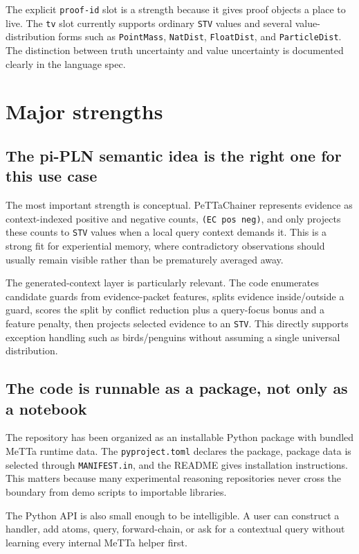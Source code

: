 \documentclass[11pt]{article}
\newcommand{\code}[1]{\texttt{#1}}
\newcommand{\fpath}[1]{\texttt{#1}}
\begin{document}
The explicit \code{proof-id} slot is a strength because it gives proof objects a
place to live.  The \code{tv} slot currently supports ordinary \code{STV} values
and several value-distribution forms such as \code{PointMass}, \code{NatDist},
\code{FloatDist}, and \code{ParticleDist}.  The distinction between truth
uncertainty and value uncertainty is documented clearly in the language spec.

\section{Major strengths}

\subsection{The pi-PLN semantic idea is the right one for this use case}

The most important strength is conceptual.  PeTTaChainer represents evidence as
context-indexed positive and negative counts, \code{(EC pos neg)}, and only
projects these counts to \code{STV} values when a local query context demands it.
This is a strong fit for experiential memory, where contradictory observations
should usually remain visible rather than be prematurely averaged away.

The generated-context layer is particularly relevant.  The code enumerates
candidate guards from evidence-packet features, splits evidence inside/outside a
guard, scores the split by conflict reduction plus a query-focus bonus and a
feature penalty, then projects selected evidence to an \code{STV}.  This directly
supports exception handling such as birds/penguins without assuming a single
universal distribution.

\subsection{The code is runnable as a package, not only as a notebook}

The repository has been organized as an installable Python package with bundled
MeTTa runtime data.  The \fpath{pyproject.toml} declares the package, package
data is selected through \fpath{MANIFEST.in}, and the README gives installation
instructions.  This matters because many experimental reasoning repositories
never cross the boundary from demo scripts to importable libraries.

The Python API is also small enough to be intelligible.  A user can construct a
handler, add atoms, query, forward-chain, or ask for a contextual query without
learning every internal MeTTa helper first.
\end{document}
